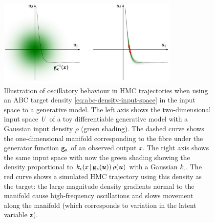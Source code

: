 \begin{figure}[!t]
\centering
\includegraphics[width=0.8\textwidth]{images/gaussian-abc-with-hmc-trajectory}
\caption[Oscillatory Hamiltonian trajectory example.]{Illustration of oscillatory behaviour in \ac{HMC} trajectories when using an \ac{ABC} target density \eqref{eq:abc-density-input-space} in the input space to a generative model. The left axis shows the two-dimensional input space $\mathit{U}$ of a toy differentiable generative model with a Gaussian input density $\rho$ (green shading). The dashed curve shows the one-dimensional manifold corresponding to the fibre under the generator function ${\mathbf{g}}_{\mathsf{x}}$ of an observed output $x$. The right axis shows the same input space with now the green shading showing the density proportional to $k_\epsilon\lpa x\gvn \genfunc_{\rvar{x}}(\vct{u})\rpa \,\rho(\vct{u})$ with a Gaussian $k_\epsilon$. The red curve shows a simulated \ac{HMC} trajectory using this density as the target: the large magnitude density gradients normal to the manifold cause high-frequency oscillations and slows movement along the manifold (which corresponds to variation in the latent variable $\mathsf{z}$).}
\label{fig:gaussian-abc-hmc-trajectory-example}
\end{figure} 

